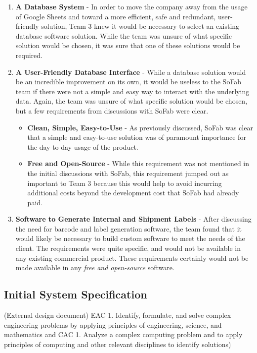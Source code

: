 \documentclass{article}
\begin{document}
\begin{enumerate}
    \item \textbf{A Database System} - In order to move the company away from the usage of Google Sheets and toward a more efficient, 
        safe and redundant, user-friendly solution, Team 3 knew it would be necessary to select an existing database software solution.
        While the team was unsure of what specific solution would be chosen, it was sure that one of these solutions would be required.
    \item \textbf{A User-Friendly Database Interface} - While a database solution would be an incredible improvement on its own, it 
        would be useless to the SoFab team if there were not a simple and easy way to interact with the underlying data. Again, the team
        was unsure of what specific solution would be chosen, but a few requirements from discussions with SoFab were clear. 
        \begin{itemize}
            \item \textbf{Clean, Simple, Easy-to-Use} - As previously discussed, SoFab was clear that a simple and easy-to-use solution
                was of paramount importance for the day-to-day usage of the product. 
            \item \textbf{Free and Open-Source} - While this requirement was not mentioned in the initial discussions with SoFab, this 
                requirement jumped out as important to Team 3 because this would help to avoid incurring additional costs beyond the 
                development cost that SoFab had already paid. 
        \end{itemize}
    \item \textbf{Software to Generate Internal and Shipment Labels} - After discussing the need for barcode and label generation software,
        the team found that it would likely be necessary to build custom software to meet the needs of the client. The requirements were 
        quite specific, and would not be available in any existing commercial product. These requirements certainly would not be made 
        available in any \textit{free and open-source} software.
\end{enumerate}
\subsection{Initial System Specification}
(External design document) 
    EAC 1. Identify, formulate, and solve complex engineering problems by 
    applying principles of engineering, science, and mathematics and CAC 1. 
    Analyze a complex computing problem and to apply principles of computing 
    and other relevant disciplines to identify solutions) 
\end{document}
